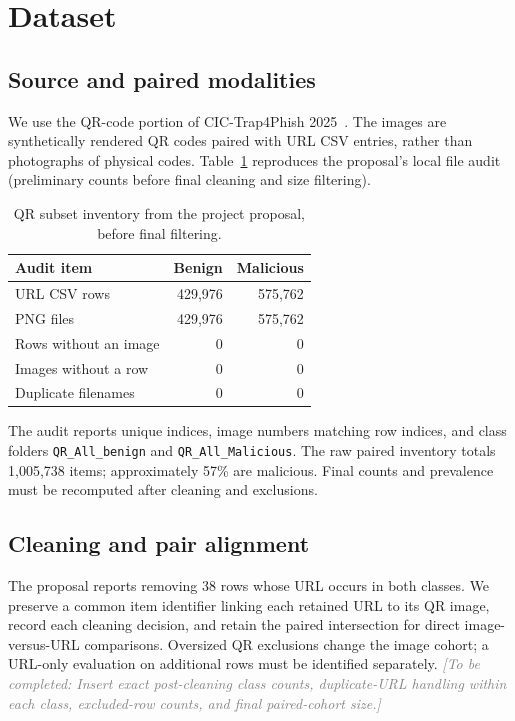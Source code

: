 \documentclass{article}
\newcommand{\pending}[1]{\textcolor{gray}{\textit{[To be completed: #1]}}}
\begin{document}
\section{Dataset}

\subsection{Source and paired modalities}
We use the QR-code portion of CIC-Trap4Phish 2025~\citep{cic,nejati}.
The images are synthetically rendered QR codes paired with URL CSV entries, rather than photographs of physical codes.
Table~\ref{tab:data} reproduces the proposal's local file audit (preliminary counts before final cleaning and size filtering).

\begin{table}[t]
\centering
\caption{QR subset inventory from the project proposal, before final filtering.}
\label{tab:data}
\small
\begin{tabular}{lrr}
\toprule
Audit item & Benign & Malicious \\
\midrule
URL CSV rows & 429{,}976 & 575{,}762 \\
PNG files & 429{,}976 & 575{,}762 \\
Rows without an image & 0 & 0 \\
Images without a row & 0 & 0 \\
Duplicate filenames & 0 & 0 \\
\bottomrule
\end{tabular}
\end{table}

The audit reports unique indices, image numbers matching row indices, and class folders \texttt{QR\_All\_benign} and \texttt{QR\_All\_Malicious}.
The raw paired inventory totals 1{,}005{,}738 items; approximately 57\% are malicious.
Final counts and prevalence must be recomputed after cleaning and exclusions.

\subsection{Cleaning and pair alignment}
The proposal reports removing 38 rows whose URL occurs in both classes.
We preserve a common item identifier linking each retained URL to its QR image, record each cleaning decision, and retain the paired intersection for direct image-versus-URL comparisons.
Oversized QR exclusions change the image cohort; a URL-only evaluation on additional rows must be identified separately.
\pending{Insert exact post-cleaning class counts, duplicate-URL handling within each class, excluded-row counts, and final paired-cohort size.}
\end{document}
